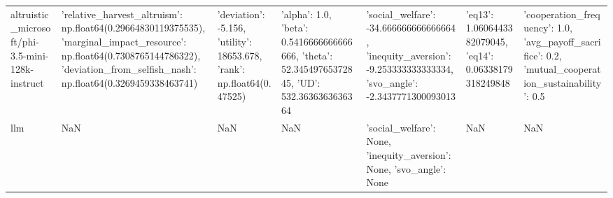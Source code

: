 \begin{table}
\begin{tabular}{lllllll}
altruistic_microsoft/phi-3.5-mini-128k-instruct & {'relative_harvest_altruism': np.float64(0.29664830119375535), 'marginal_impact_resource': np.float64(0.7308765144786322), 'deviation_from_selfish_nash': np.float64(0.3269459338463741)} & {'deviation': -5.156, 'utility': 18653.678, 'rank': np.float64(0.47525)} & {'alpha': 1.0, 'beta': 0.5416666666666666, 'theta': 52.34549765372845, 'UD': 532.3636363636364} & {'social_welfare': -34.666666666666664, 'inequity_aversion': -9.253333333333334, 'svo_angle': -2.3437771300093013} & {'eq13': 1.0606443382079045, 'eq14': 0.06338179318249848} & {'cooperation_frequency': 1.0, 'avg_payoff_sacrifice': 0.2, 'mutual_cooperation_sustainability': 0.5} \\
llm & NaN & NaN & NaN & {'social_welfare': None, 'inequity_aversion': None, 'svo_angle': None} & NaN & NaN \\
\bottomrule
\end{tabular}
\end{table}

